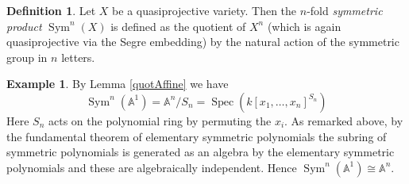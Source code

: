 \documentclass[11pt, a4paper, english, twoside]{article}
\theoremstyle{plain}
\theoremstyle{definition}
\newtheorem{definition}[theorem]{Definition}
\newtheorem{example}[theorem]{Example}
\DeclareMathOperator{\Spec}{Spec}
\DeclareMathOperator{\Sym}{Sym}
\begin{document}
\begin{definition}
    \label{symdef}
    Let $X$ be a quasiprojective variety. Then the $n$-fold \emph{symmetric product} $\Sym^n(X)$ is defined as the quotient of $X^n$
    (which is again quasiprojective via the Segre embedding) by the natural action of the symmetric group in $n$ letters.
\end{definition}

\begin{example}
    By Lemma \ref{quotAffine} we have 
    \[
        \Sym^n(\mathbb{A}^1) = \mathbb{A}^n/S_n = \Spec(k[x_1,\dots,x_n]^{S_n})
    \]
    Here $S_n$ acts on the
    polynomial ring by permuting the $x_i$. As remarked above, by the fundamental theorem of elementary symmetric polynomials the subring
    of symmetric polynomials is generated as an algebra by the elementary symmetric polynomials and these are algebraically independent. Hence
    $\Sym^n(\mathbb{A}^1) \cong \mathbb{A}^n$.
\end{example}
\end{document}
